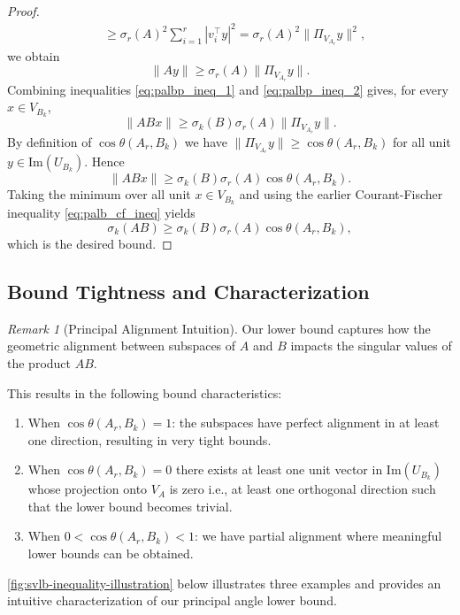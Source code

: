 \documentclass{article}
\newcommand{\prinangle}{\cos\theta}
\theoremstyle{plain}
\theoremstyle{definition}
\theoremstyle{remark}
\newtheorem{remark}[theorem]{Remark}
\begin{document}
\begin{proof}
\begin{align*}
&\ge \sigma_r(A)^2\sum_{i =1}^r  |v_i^\top y|^2  = \sigma_r(A)^2 \|\Pi_{V_{A_r}} y\|^2,
\end{align*}
we obtain 
\begin{equation}
\label{eq:palbp_ineq_2}
\|Ay\| \geq \sigma_r(A)\|\Pi_{V_{A_r}} y\|.
\end{equation}
Combining inequalities \cref{eq:palbp_ineq_1} and \cref{eq:palbp_ineq_2} gives, for every $x \in V_{B_k}$,
\[
\|ABx\| \geq \sigma_k(B)\sigma_r(A) \|\Pi_{V_{A_r}} y\|.
\]
By definition of $\prinangle(A_r, B_k)$ we have $\|\Pi_{V_{A_r}} y\| \ge \prinangle(A_r, B_k)$ for all unit $y \in \mathrm{Im}(U_{B_k})$. Hence \[
    \|ABx\| \geq \sigma_k(B) \sigma_r(A) \prinangle(A_r, B_k).
\]
Taking the minimum over all unit $x \in V_{B_k}$ and using the earlier Courant-Fischer inequality \cref{eq:palb_cf_ineq} yields \[
    \sigma_k(AB) \geq \sigma_k(B) \sigma_r(A) \prinangle(A_r, B_k),
\]
which is the desired bound.
\end{proof}


\subsection{Bound Tightness and Characterization}
\label{app:bound-tightness}


\begin{remark}[Principal Alignment Intuition]
Our lower bound captures how the geometric alignment between subspaces of $A$ and $B$ impacts the singular values of the product $AB$.

This results in the following bound characteristics:
\begin{enumerate}
    \item When $\prinangle(A_r, B_k) = 1$: the subspaces have perfect alignment in at least one direction, resulting in very tight bounds.
    \item When $\prinangle(A_r, B_k) = 0$ there exists at least one unit vector in $\mathrm{Im}(U_{B_k})$ whose projection onto $V_A$ is zero i.e., at least one orthogonal direction such that the lower bound becomes trivial.
    \item When $0 < \prinangle(A_r, B_k) < 1$: we have partial alignment where meaningful lower bounds can be obtained.
\end{enumerate}
\cref{fig:svlb-inequality-illustration} below illustrates three examples and provides an intuitive characterization of our principal angle lower bound.
\end{remark}
\end{document}
